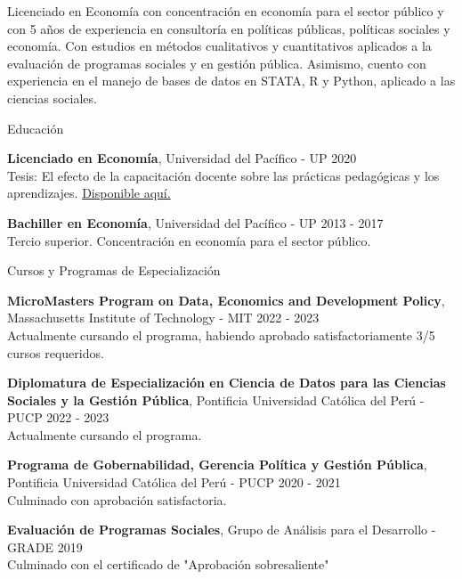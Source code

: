 \documentclass{resume} %
\begin{document}
\item {Licenciado en Economía con concentración en economía para el sector público y con 5 años de experiencia en consultoría en políticas públicas, políticas sociales y economía. Con estudios en métodos cualitativos y cuantitativos aplicados a la evaluación de programas sociales y en gestión pública. Asimismo, cuento con experiencia en el manejo de bases de datos en STATA, R y Python, aplicado a las ciencias sociales.}


\begin{rSection}{Educación}

{\bf Licenciado en Economía}, Universidad del Pacífico - UP \hfill {2020} \\
Tesis: El efecto de la capacitación docente sobre las prácticas pedagógicas y los aprendizajes. \href{https://repositorio.up.edu.pe/handle/11354/2653}{Disponible aquí.}

{\bf Bachiller en Economía}, Universidad del Pacífico - UP \hfill {2013 - 2017}\\
Tercio superior. Concentración en economía para el sector público.

\end{rSection}


\begin{rSection}{Cursos y Programas de Especialización}

{\bf MicroMasters Program on Data, Economics and Development Policy}, Massachusetts Institute of Technology - MIT \hfill {2022 - 2023}\\
Actualmente cursando el programa, habiendo aprobado satisfactoriamente 3/5 cursos requeridos.

{\bf Diplomatura de Especialización en Ciencia de Datos para las Ciencias Sociales y la Gestión Pública}, Pontificia Universidad Católica del Perú - PUCP \hfill {2022 - 2023}\\
Actualmente cursando el programa.

{\bf Programa de Gobernabilidad, Gerencia Política y Gestión Pública}, Pontificia Universidad Católica del Perú - PUCP \hfill {2020 - 2021}\\
Culminado con aprobación satisfactoria.

{\bf Evaluación de Programas Sociales}, Grupo de Análisis para el Desarrollo - GRADE \hfill {2019}\\
Culminado con el certificado de "Aprobación sobresaliente"

\end{rSection}
\end{document}
